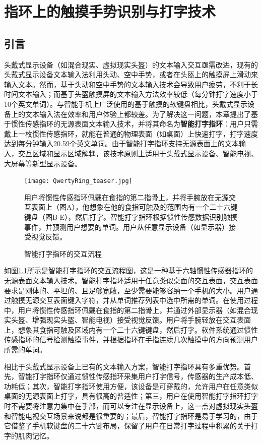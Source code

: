 \chapter{指环上的触摸手势识别与打字技术}\label{section:QwertyRing}

\section{引言}

头戴式显示设备（如混合现实、虚拟现实头盔）的文本输入交互亟需改进，现有的头戴式显示设备文本输入法利用头动\cite{yu2017tap}、空中手势\cite{gupta2019rotoswype}，或者在头盔上的触摸屏上滑动\cite{grossman2015typing, yu2016one}来输入文本。然而，基于头动和空中手势的文本输入技术会导致用户疲劳，不利于长时间文本输入；而基于头盔触摸屏的文本输入方法效率较低（每分钟打字速度小于10个英文单词）。与智能手机上广泛使用的基于触摸的软键盘相比，头戴式显示设备上的文本输入法在效率和用户体验上都较差。为了解决这一问题，本章提出了基于惯性传感指环的无源表面文本输入技术，并将其命名为\textbf{智能打字指环}：用户只需戴上一枚惯性传感指环，就能在普通的物理表面（如桌面）上快速打字，打字速度达到每分钟输入20.59个英文单词。由于智能打字指环支持无源表面上的文本输入，交互区域和显示区域解耦，该技术原则上适用于头戴式显示设备、智能电视、大屏幕等新型显示设备。

\begin{figure}
	\centering
	\texttt{[image: QwertyRing\_teaser.jpg]}
	\caption*{用户将惯性传感指环佩戴在食指的第二指骨上，并将手腕放在无源交互表面上（图A），他想象在他的食指可触及的范围内有一个二十六键键盘（图B-E），然后打字。智能打字指环根据惯性传感数据识别触摸事件，并预测用户想要的单词。用户从任意显示设备（如显示器）接受视觉反馈。}
	\caption{智能打字指环的交互流程}
	\label{fig:QwertyRing_teaser}
\end{figure}

如图\ref{fig:QwertyRing_teaser}所示是智能打字指环的交互流程图，这是一种基于六轴惯性传感器指环的无源表面文本输入技术。智能打字指环适用于任意类似桌面的交互表面，交互表面要求是刚体的、平坦的、且足够宽敞，至少需要能够容纳一个手机的大小。用户通过触摸无源交互表面键入字符，并从单词推荐列表中选中所需的单词。在使用过程中，用户将惯性传感指环佩戴在食指的第二指骨上，并通过外部显示器（如混合现实头盔、增强现实头盔、智能电视）接受视觉反馈。用户将手腕轻放在交互表面上，想象其食指可触及区域内有一个二十六键键盘，然后打字。软件系统通过惯性传感指环的信号检测触摸事件，并根据指环在手指连续几次触摸中的方向预测用户所需的单词。

相比于头戴式显示设备上已有的文本输入方案，智能打字指环具有多重优势。首先，智能打字指环仅通过惯性传感指环采集用户打字信号，传感器的生产成本低、功耗低；其次，智能打字指环使用方便，该设备是可穿戴的，允许用户在任意类似桌面的无源表面上打字，具有很高的普适性；第三，用户在使用智能打字指环打字时不需要将注意力集中在手部，而可以专注在显示设备上，这一点对虚拟现实头盔和智能电视交互场景来说都是很重要的\cite{lu2017blindtype}；最后，智能打字指环是易于学习的，由于它借鉴了手机软键盘的二十六键布局，保留了用户在日常打字过程中积累的关于打字的肌肉记忆。

